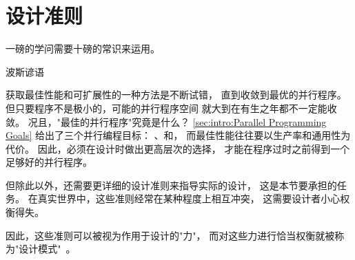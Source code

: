 
\section{设计准则}
\label{sec:SMPdesign:Design Criteria}
%
\epigraph{一磅的学问需要十磅的常识来运用。}
	 {波斯谚语}

获取最佳性能和可扩展性的一种方法是不断试错，
直到收敛到最优的并行程序。
但只要程序不是极小的，可能的并行程序空间
就大到在有生之年都不一定能收敛。
况且，"最佳的并行程序"究竟是什么？
\cref{sec:intro:Parallel Programming Goals}
给出了三个并行编程目标：
、和，
而最佳性能往往要以生产率和通用性为代价。
因此，必须在设计时做出更高层次的选择，
才能在程序过时之前得到一个足够好的并行程序。

但除此以外，还需要更详细的设计准则来指导实际的设计，
这是本节要承担的任务。
在真实世界中，这些准则经常在某种程度上相互冲突，
这需要设计者小心权衡得失。

因此，这些准则可以被视为作用于设计的"力"，
而对这些力进行恰当权衡就被称为"设计模式"~\cite{Alexander79,GOF95}。

